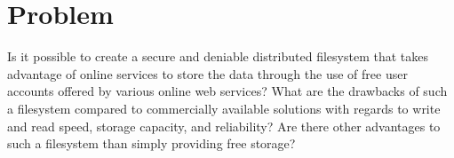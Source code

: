 
\section{Problem}
\label{sec:problem}

Is it possible to create a secure and deniable distributed filesystem that takes advantage of online services to store the data through the use of free user accounts offered by various online web services? What are the drawbacks of such a filesystem compared to commercially available solutions with regards to write and read speed, storage capacity, and reliability? Are there other advantages to such a filesystem than simply providing free storage?



